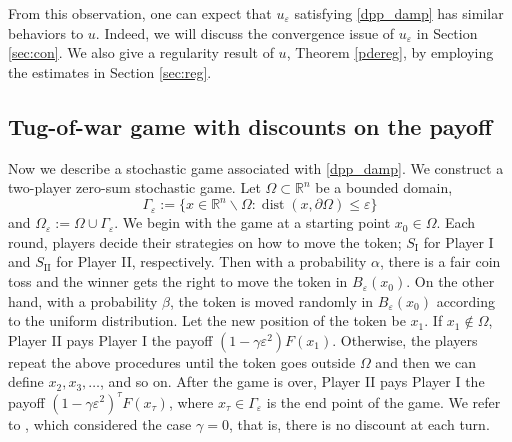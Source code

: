 \documentclass[english]{amsart}
\newcommand{\dist}{\operatorname{dist}}
\newcommand{\eps}{\varepsilon}
\theoremstyle{plain}
\theoremstyle{definition}
\theoremstyle{remark}
\numberwithin{equation}{section}
\begin{document}
From this observation, one can expect that $u_\eps$ satisfying \eqref{dpp_damp} has similar behaviors to $u$. 
Indeed, we will discuss the convergence issue of $u_{\eps}$ in Section \ref{sec:con}.
We also give a regularity result of $u$, Theorem \ref{pdereg}, by employing the estimates in Section \ref{sec:reg}.

\subsection{Tug-of-war game with discounts on the payoff}
\label{ssec:tow}
Now we describe a stochastic game associated with \eqref{dpp_damp}.
We construct a two-player zero-sum stochastic game.
Let $\Omega \subset \mathbb{R}^{n} $ be a bounded domain, 
$$ \Gamma_{\eps} := \{x\in \mathbb{R}^n\backslash \Omega : \dist(x,\partial \Omega)\le \eps \}$$
and $\Omega_{\eps}:=\Omega \cup \Gamma_{\eps} $. 
We begin with the game at a starting point $x_0\in\Omega$.
Each round, players decide their strategies on how to move the token; $S_{\textrm{I}}$ for Player I and $S_{\textrm{II}}$ for Player II, respectively.
Then with a probability $\alpha$, there is a fair coin toss and the winner gets the right to move the token in $B_{\eps}(x_0)$.
On the other hand, with a probability $\beta$, the token is moved randomly in $B_{\eps}(x_0)$ according to the uniform distribution.
Let the new position of the token be $x_1$. If $x_1\not\in \Omega$, Player II pays Player I the payoff $(1-\gamma\eps^2)F(x_1)$.
Otherwise, the players repeat the above procedures until the token goes outside $\Omega$
and then we can define $x_2, x_3, \dots$, and so on.
After the game is over, Player II pays Player I the payoff $(1-\gamma\eps^2)^{\tau}F(x_\tau)$, 
where $x_{\tau}\in\Gamma_{\eps}$ is the end point of the game.
We refer to \cite{MR3623556,MR4125101}, which considered the case $\gamma=0$, that is, there is no discount at each turn.
\end{document}
